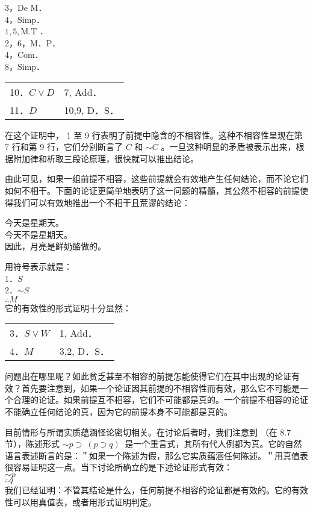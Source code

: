 3，De M．\\
4，Simp．\\
$1,5, \mathrm{M} . \mathrm{T}$ ．\\
2，6，M．P．\\
4，Com．\\
8，Simp．

\begin{center}
\begin{tabular}{ll}
10．$C \vee D$ & 7, Add． \\
11．$D$ & 10,9, D．S． \\
\end{tabular}
\end{center}

在这个证明中， 1 至 9 行表明了前提中隐含的不相容性。这种不相容性呈现在第 7 行和第 9 行，它们分别断言了 $C$ 和 $\sim C$ 。一旦这种明显的矛盾被表示出来，根据附加律和析取三段论原理，很快就可以推出结论。

由此可见，如果一组前提不相容，这些前提就会有效地产生任何结论，而不论它们如何不相干。下面的论证更简单地表明了这一问题的精髓，其公然不相容的前提使得我们可以有效地推出一个不相干且荒谬的结论：

今天是星期天。\\
今天不是星期天。\\
因此，月亮是鲜奶酪做的。

用符号表示就是：\\
1．$S$\\
2．$\sim S$\\
$\therefore M$\\
它的有效性的形式证明十分显然：

\begin{center}
\begin{tabular}{ll}
3．$S \vee W$ & 1, Add． \\
4．$M$ & 3,2, D．S． \\
\end{tabular}
\end{center}

问题出在哪里呢？如此贫乏甚至不相容的前提怎能使得它们在其中出现的论证有效？首先要注意到，如果一个论证因其前提的不相容性而有效，那么它不可能是一个合理的论证。如果前提互不相容，它们不可能都是真的。一个前提不相容的论证不能确立任何结论的真，因为它的前提本身不可能都是真的。

目前情形与所谓实质蕴涵怪论密切相关。在讨论后者时，我们注意到 （在 8.7 节），陈述形式 $\sim p \supset ~(p \supset q) ~$ 是一个重言式，其所有代人例都为真。它的自然语言表述断言的是：＂如果一个陈述为假，那么它实质蕴涵任何陈述。＂用真值表很容易证明这一点。当下讨论所确立的是下述论证形式有效：\\
$\sim p$\\
$\therefore q$\\
我们已经证明：不管其结论是什么，任何前提不相容的论证都是有效的。它的有效性可以用真值表，或者用形式证明判定。

